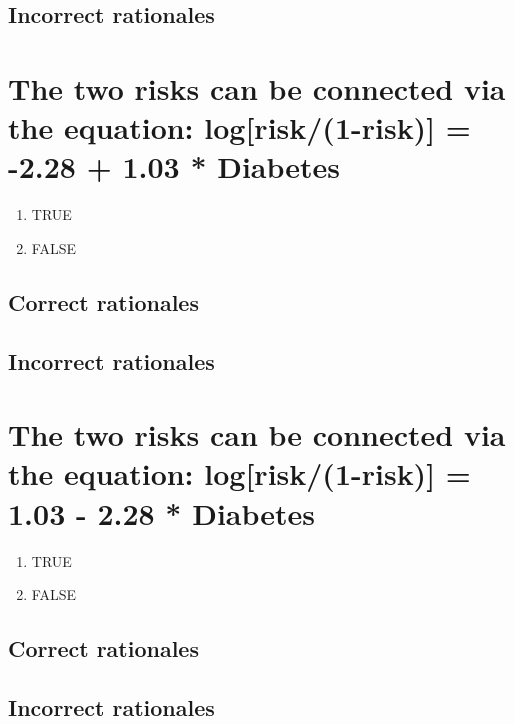 \documentclass[letterpaper,9pt,twoside,printwatermark=false]{pinp}
\providecommand{\tightlist}{%
  \setlength{\itemsep}{0pt}\setlength{\parskip}{0pt}}
\begin{document}
\subsection{Incorrect rationales}\label{incorrect-rationales-4}

\section{The two risks can be connected via the equation:
log{[}risk/(1-risk){]} = -2.28 + 1.03 *
Diabetes}\label{the-two-risks-can-be-connected-via-the-equation-logrisk1-risk--2.28-1.03-diabetes}

\begin{enumerate}
\def\labelenumi{\alph{enumi}.}
\tightlist
\item
  TRUE
\item
  FALSE
\end{enumerate}

\subsection{Correct rationales}\label{correct-rationales-5}

\subsection{Incorrect rationales}\label{incorrect-rationales-5}

\section{The two risks can be connected via the equation:
log{[}risk/(1-risk){]} = 1.03 - 2.28 *
Diabetes}\label{the-two-risks-can-be-connected-via-the-equation-logrisk1-risk-1.03---2.28-diabetes}

\begin{enumerate}
\def\labelenumi{\alph{enumi}.}
\tightlist
\item
  TRUE
\item
  FALSE
\end{enumerate}

\subsection{Correct rationales}\label{correct-rationales-6}

\subsection{Incorrect rationales}\label{incorrect-rationales-6}
\end{document}
